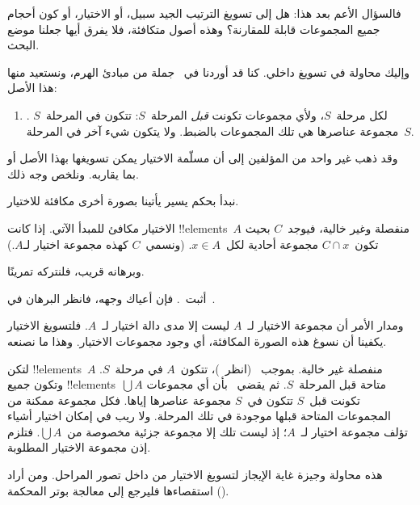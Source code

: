 \documentclass[../../../include/open-logic-section]{subfiles}
\begin{document}

فالسؤال الأعم بعد هذا: هل إلى تسويغ الترتيب الجيد سبيل، أو الاختيار،
أو كون أحجام جميع المجموعات قابلة للمقارنة؟ وهذه أصول متكافئة، فلا
يفرق أيها جعلنا موضع البحث.

وإليك محاولة في تسويغ داخلي. كنا قد أوردنا في~
جملة من مبادئ الهرم، ونستعيد منها هذا الأصل:
\begin{enumerate}
	\item[] \stagesacc. لكل مرحلة~$S$، ولأي مجموعات تكونت
	\emph{قبل} المرحلة~$S$: تتكون في المرحلة~$S$ مجموعة عناصرها هي تلك
	المجموعات بالضبط. ولا يتكون شيء آخر في المرحلة~$S$.
\end{enumerate}
وقد ذهب غير واحد من المؤلفين إلى أن مسلّمة الاختيار يمكن تسويغها بهذا
الأصل أو بما يقاربه. ونلخص وجه ذلك.

نبدأ بحكم يسير يأتينا بصورة أخرى مكافئة للاختيار.

\begin{thm}[في $\ZF$]
الاختيار مكافئ للمبدأ الآتي. إذا كانت !!{element}s~$A$ منفصلة وغير
خالية، فيوجد~$C$ بحيث تكون~$C \cap x$ مجموعة أحادية لكل~$x \in A$.
(ونسمي~$C$ كهذه {مجموعة اختيار} لـ$A$.)
\end{thm}

وبرهانه قريب، فلنتركه تمرينًا.

\begin{prob}
أثبت~. فإن أعياك وجهه،
فانظر البرهان في~\cite[pp.~242--3]{Potter2004}.
\end{prob}

ومدار الأمر أن مجموعة الاختيار لـ~$A$ ليست إلا مدى دالة اختيار
لـ~$A$. فلتسويغ الاختيار يكفينا أن نسوغ هذه الصورة المكافئة، أي وجود
مجموعات الاختيار. وهذا ما نصنعه.

لتكن !!{element}s~$A$ منفصلة غير خالية. بموجب~\stageshier{}
(انظر~)، تتكون~$A$ في مرحلة~$S$. وتكون جميع
!!{element}s~$\bigcup A$ متاحة قبل المرحلة~$S$. ثم يقضي~\stagesacc{}
بأن أي مجموعات تكونت قبل~$S$ تتكون في~$S$ مجموعة عناصرها إياها. فكل
مجموعة ممكنة من المجموعات المتاحة قبلها موجودة في تلك المرحلة. ولا ريب في
إمكان اختيار أشياء تؤلف مجموعة اختيار لـ~$A$؛ إذ ليست تلك إلا مجموعة
جزئية مخصوصة من~$\bigcup A$. فتلزم إذن مجموعة الاختيار المطلوبة.

هذه محاولة وجيزة غاية الإيجاز لتسويغ الاختيار من داخل تصور المراحل.
ومن أراد استقصاءها فليرجع إلى معالجة بوتر المحكمة
(\citeyear[\S14.8]{Potter2004}).
\end{document}
